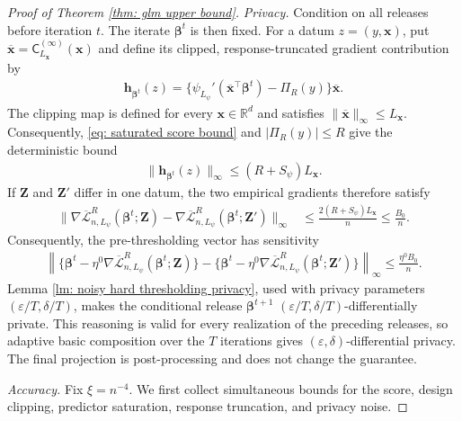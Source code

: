 \documentclass[letterpaper,12pt]{article}
\numberwithin{equation}{section}
\theoremstyle{plain}
\numberwithin{Theorem}{section}
\numberwithin{proposition}{section}
\numberwithin{Lemma}{section}
{
	\theoremstyle{definition}
	\newtheorem{Definition}{Definition}
	\newtheorem{example}{Example}
	\numberwithin{example}{section}
	\newtheorem{fact}{Fact}
	\numberwithin{fact}{section}
	\newtheorem{remark}{Remark}
}
\newcommand{\1}{\mathbbm{1}}
\def\bbeta{{\boldsymbol{\beta}}}
\def\L{{\mathcal L}}
\begin{document}
\begin{proof}[Proof of Theorem \ref{thm: glm upper bound}]
\textit{Privacy.}
Condition on all releases before iteration $t$.  The iterate
$\bbeta^t$ is then fixed.  For a datum $z=(y,\bm x)$, put
$\overline{\bm x}=\mathsf C_{L_{\bm x}}^{(\infty)}(\bm x)$ and define
its clipped, response-truncated gradient contribution by
\begin{align*}
    \bm h_{\bbeta^t}(z)
    =\{\psi_{L_\psi}'(\overline{\bm x}^\top\bbeta^t)-\Pi_R(y)\}
    \overline{\bm x}.
\end{align*}
The clipping map is defined for every \(\bm x\in\mathbb R^d\) and
satisfies \(\|\overline{\bm x}\|_\infty\leq L_{\bm x}\).
Consequently, \eqref{eq: saturated score bound} and
$|\Pi_R(y)|\leq R$ give the deterministic bound
\begin{align*}
    \|\bm h_{\bbeta^t}(z)\|_\infty
    \leq(R+S_\psi)L_{\bm x}.
\end{align*}
If $\bm Z$ and $\bm Z'$ differ in one datum, the two empirical
gradients therefore satisfy
\begin{align*}
\|\nabla\overline\L_{n,L_\psi}^R(\bbeta^t;\bm Z)
-\nabla\overline\L_{n,L_\psi}^R(\bbeta^t;\bm Z')\|_\infty
&\leq\frac{2(R+S_\psi)L_{\bm x}}n
 \leq\frac{B_0}{n}.
\end{align*}
Consequently, the pre-thresholding vector has sensitivity
\begin{align*}
    \left\|
    \{\bbeta^t-\eta^0\nabla\overline\L_{n,L_\psi}^R
    (\bbeta^t;\bm Z)\}
    -\{\bbeta^t-\eta^0\nabla\overline\L_{n,L_\psi}^R
    (\bbeta^t;\bm Z')\}
    \right\|_\infty
    \leq \frac{\eta^0B_0}{n}.
\end{align*}
Lemma \ref{lm: noisy hard thresholding privacy}, used with privacy
parameters $(\varepsilon/T,\delta/T)$, makes the conditional release
$\bbeta^{t+1}$ $(\varepsilon/T,\delta/T)$-differentially private.
This reasoning is valid for every realization of the preceding
releases, so adaptive basic composition over the $T$ iterations gives
$(\varepsilon,\delta)$-differential privacy.  The final projection is
post-processing and does not change the guarantee.

\textit{Accuracy.}
Fix $\xi=n^{-4}$.  We first collect simultaneous bounds for the score,
design clipping, predictor saturation, response truncation, and privacy
noise.


\end{proof}
\end{document}
